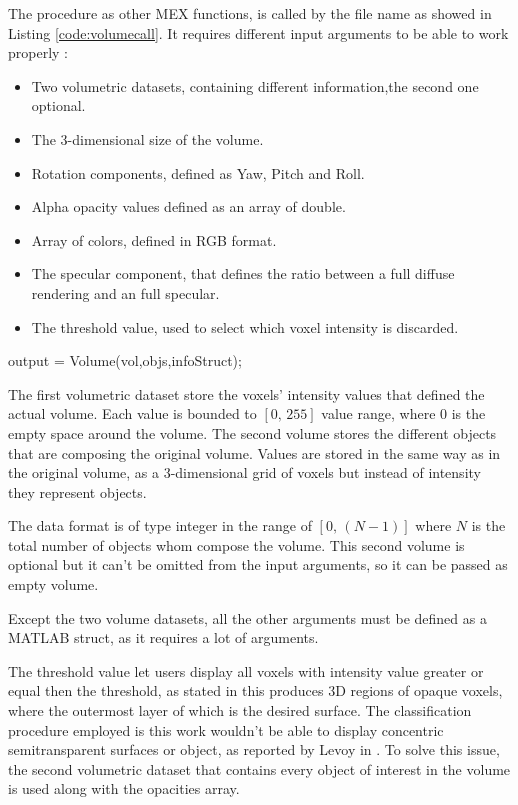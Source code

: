 \documentclass[12pt,a4paper]{extarticle}
\newcommand{\linespace}{\vspace{8pt}}
\begin{document}
The procedure as other MEX functions, is called by the file name as showed in Listing \ref{code:volumecall}. It requires different input arguments to be able to work properly :
\begin{itemize}
\item Two volumetric datasets, containing different information,the second one optional.
\item The 3-dimensional size of the volume.
\item Rotation components, defined as Yaw, Pitch and Roll.
\item Alpha opacity values defined as an array of double.
\item Array of colors, defined in RGB format.
\item The specular component, that defines the ratio between a full diffuse rendering and an full specular. 
\item The threshold value, used to select which voxel intensity is discarded.
\end{itemize}

\begin{cpp}[caption={Volume rendering MEX function call with left and right arguments, respectively output and input arguments},label=code:volumecall]
output = Volume(vol,objs,infoStruct);
\end{cpp}

The first volumetric dataset store the voxels' intensity values that defined the actual volume. Each value is bounded to $[0,\,255]$ value range, where $0$ is the empty space around the volume. The second volume stores the different objects that are composing the original volume. Values are stored in the same way as in the original volume, as a 3-dimensional grid of voxels but instead of intensity they represent objects. 

The data format is of type integer in the range of $[0,\,(N-1)]$ where $N$ is the total number of objects whom compose the volume. This second volume is optional but it can't be omitted from the input arguments, so it can be passed as empty volume.

Except the two volume datasets, all the other arguments must be defined as a MATLAB struct, as it requires a lot of arguments.
\linespace

The threshold value let users display all voxels with intensity value greater or equal then the threshold, as stated in \cite{levoy_1988:4} this produces 3D regions of opaque voxels, where the outermost layer of which is the desired surface.
The classification procedure employed is this work wouldn't be able to display concentric semitransparent surfaces or object, as reported by Levoy in \cite{levoy_1988:4}. To solve this issue, the second volumetric dataset that contains every object of interest in the volume is used along with the opacities array.
\linespace
\end{document}
